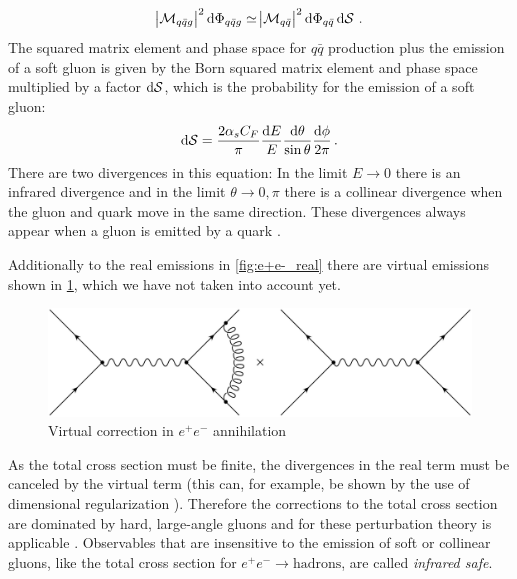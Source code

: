 %
\begin{equation}
  \abs{\matrixelement_{q \bar q g}}^2 \dif \Phi_{q \bar q g} \simeq \abs{\matrixelement_{q \bar q}}^2 \dif \Phi_{q \bar q} \dif \softgluon \, .
\end{equation}
%
The squared matrix element and phase space for $q \bar q$ production plus the emission of a soft gluon is given by the Born squared matrix element and phase space multiplied by a factor $\dif \softgluon$, which is the probability for the emission of a soft gluon:
%
\begin{equation}
  \dif \softgluon = \frac{2 \alpha_s C_F}{\pi} \frac{\dif E}{E} \frac{\dif \theta}{\sin \theta} \frac{\dif \phi}{2 \pi} \, .
\end{equation}
%
There are two divergences in this equation:
In the limit $E \rightarrow 0$ there is an infrared divergence and in the limit $\theta \rightarrow 0,\pi$ there is a collinear divergence when the gluon and quark move in the same direction.
These divergences always appear when a gluon is emitted by a quark \cite{salam2010}.

Additionally to the real emissions in \cref{fig:e+e-_real} there are virtual emissions shown in \cref{fig:e+e-_virtual}, which we have not taken into account yet.
%
\begin{figure}[]
	\includegraphics[width=\textwidth]{images/e+e-_virtual.pdf}
	\caption{Virtual correction in $e^+ e^-$ annihilation}
	\label{fig:e+e-_virtual}
\end{figure}
%
As the total cross section must be finite, the divergences in the real term must be canceled by the virtual term (this can, for example, be shown by the use of dimensional regularization \cite{ellis1996}).
Therefore the corrections to the total cross section are dominated by hard, large-angle gluons and for these perturbation theory is applicable \cite{salam2010}.
Observables that are insensitive to the emission of soft or collinear gluons, like the total cross section for $e^+ e^- \rightarrow \text{hadrons}$, are called \textit{infrared safe}.
%

